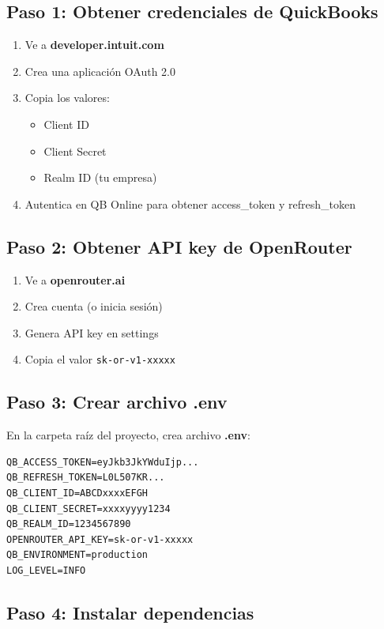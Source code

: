 \documentclass[12pt,oneside]{article}
\begin{document}
\subsection{Paso 1: Obtener credenciales de QuickBooks}

\begin{enumerate}
    \item Ve a \textbf{developer.intuit.com}
    \item Crea una aplicación OAuth 2.0
    \item Copia los valores:
    \begin{itemize}
        \item Client ID
        \item Client Secret
        \item Realm ID (tu empresa)
    \end{itemize}
    \item Autentica en QB Online para obtener access\_token y refresh\_token
\end{enumerate}

\subsection{Paso 2: Obtener API key de OpenRouter}

\begin{enumerate}
    \item Ve a \textbf{openrouter.ai}
    \item Crea cuenta (o inicia sesión)
    \item Genera API key en settings
    \item Copia el valor \texttt{sk-or-v1-xxxxx}
\end{enumerate}

\subsection{Paso 3: Crear archivo .env}

En la carpeta raíz del proyecto, crea archivo \textbf{.env}:

\begin{verbatim}
QB_ACCESS_TOKEN=eyJkb3JkYWduIjp...
QB_REFRESH_TOKEN=L0L507KR...
QB_CLIENT_ID=ABCDxxxxEFGH
QB_CLIENT_SECRET=xxxxyyyy1234
QB_REALM_ID=1234567890
OPENROUTER_API_KEY=sk-or-v1-xxxxx
QB_ENVIRONMENT=production
LOG_LEVEL=INFO
\end{verbatim}

\subsection{Paso 4: Instalar dependencias}
\end{document}
